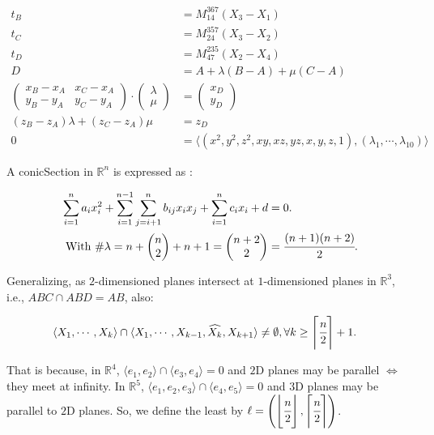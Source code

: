\documentclass[12pt]{article}
\begin{document}
\begin{align}
t_B &= M_{14}^{367} (X_3 - X_1)\\
t_C &= M_{24}^{357} (X_3 - X_2) \\
t_D &= M_{47}^{235} (X_2 - X_4) \\
D &= A + \lambda (B - A) + \mu (C - A) \\
\begin{pmatrix}
    x_B - x_A & x_C - x_A \\
    y_B - y_A & y_C - y_A
\end{pmatrix} \cdot \begin{pmatrix}
    \lambda \\ \mu
\end{pmatrix} &= \begin{pmatrix}
    x_D \\ y_D 
\end{pmatrix} \\
(z_B - z_A) \lambda + (z_C - z_A)\mu &= z_D \\
0 &= \langle (x^2, y^2, z^2, xy, xz, yz, x, y, z, 1), (\lambda_1, \cdots, \lambda_{10})\rangle
\end{align}

A conicSection in $\mathbb{R}^n$ is expressed as :

\begin{align}
    \sum_{i=1}^n a_i x_i^2 +\sum_{i=1}^{n-1} \sum_{j=i+1}^n b_{ij} x_i x_j +  \sum_{i=1}^n c_i x_i + d &= 0. \\
    \text{With }\# \lambda = n + \begin{pmatrix}
        n \\ 2
    \end{pmatrix} + n + 1 = \begin{pmatrix}
        n + 2 \\ 2
    \end{pmatrix} &= \cfrac{(n+1)(n+2)}{2}.
\end{align}

Generalizing, as $2$-dimensioned planes intersect at $1$-dimensioned planes in $\mathbb{R}^3$, i.e., $ABC \cap ABD = AB$, also:

\begin{align}
\langle X_1, \cdots, X_k \rangle \cap \langle X_1, \cdots, X_{k-1}, \widehat{X_k}, X_{k+1} \rangle &\ne \emptyset, \forall k \ge \left\lceil\cfrac{n}{2}\right\rceil + 1.
\end{align}

That is because, in $\mathbb{R}^4$, $\langle e_1, e_2 \rangle \cap \langle e_3, e_4 \rangle = 0$ and $2$D planes may be parallel $\Leftrightarrow$ they meet at infinity. In $\mathbb{R}^5$, $\langle e_1, e_2, e_3 \rangle \cap \langle e_4, e_5 \rangle = 0$ and $3$D planes may be parallel to $2$D planes. So, we define the least by $\ell = \left(\left\lfloor \cfrac{n}{2} \right\rfloor,\left\lceil \cfrac{n}{2} \right\rceil\right)$.
\end{document}
